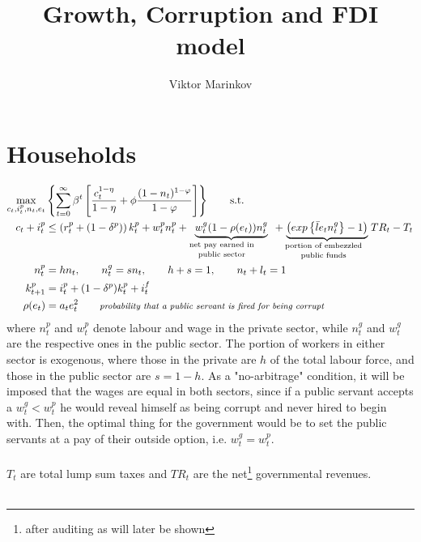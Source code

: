 \documentclass[]{scrartcl}
\title{Growth, Corruption and FDI model}
\author{Viktor Marinkov}
\begin{document}
\maketitle


\section{Households}
\begin{align}
\max_{c_t,i^p_t,n_t,e_t}&\left\lbrace \sum_{t=0}^{\infty}\beta^t\left[ \frac{c_t^{1-\eta}}{1-\eta}+\phi\frac{(1-n_t)^{1-\varphi}}{1-\varphi} \right] \right\rbrace \qquad\text{s.t.}\\
c_t+i^p_t&\leq \left( r^p_t+(1-\delta^p) \right)k^p_t +w^p_t n_t^p+\underbrace{w^g_t (1-\rho(e_t))n^g_t}_{\textrm{\parbox{1.1in}{\shortstack{net pay earned in\\public sector}}}}+\underbrace{\left( exp\left\lbrace \bar{l}e_tn^g_t \right\rbrace-1 \right)}_{\textrm{\parbox{1.1in}{\shortstack{portion of embezzled\\public funds}}}}TR_t-T_t\\
n_t^p&= hn_t,\qquad n_t^g=sn_t,\qquad h+s=1, \qquad n_t+l_t=1\\
k^p_{t+1}&=i^p_t+(1-\delta^p)k_t^p +i^f_t\\
\rho(e_t)&=a_te_t^2 \qquad \textit{\footnotesize probability that a public servant is fired for being corrupt}
\end{align}
where $ n^p_t $ and $ w^p_t $ denote labour and wage in the private sector, while $ n^g_t $ and $ w^g_t  $ are the respective ones in the public sector. The portion of workers in either sector is exogenous, where those in the private are $ h $ of the total labour force, and those in the public sector are $ s=1-h $. As a "no-arbitrage" condition, it will be imposed that the wages are equal in both sectors, since if a public servant accepts a $ w_t^g<w_t^p $ he would reveal himself as being corrupt and never hired to begin with. Then, the optimal thing for the government would be to set the public servants at a pay of their outside option, i.e. $ w_t^g=w_t^p $.\\\\ $ T_t $ are total lump sum taxes and $ TR_t $ are the net\footnote{after auditing as will later be shown} governmental revenues.\\\\
\end{document}

